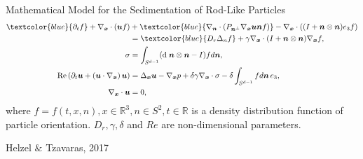\begin{frame}{Mathematical Model for the Sedimentation of Rod-Like Particles}
	\scriptsize
	\begin{align*}
		\textcolor{blue}{\partial_t f}+\nabla_{\boldsymbol{x}} \cdot(\boldsymbol{u} f) & +\textcolor{blue}{\nabla_{\boldsymbol{n}} \cdot\left(P_{\boldsymbol{n}^{\perp}} \nabla_{\boldsymbol{x}} \boldsymbol{u} \boldsymbol{n} f\right)}-\nabla_{\boldsymbol{x}} \cdot\left((I+\boldsymbol{n} \otimes \boldsymbol{n}) e_3 f\right) \\
		& =\textcolor{blue}{D_r \Delta_n f}+\gamma \nabla_{\boldsymbol{x}} \cdot(I+\boldsymbol{n} \otimes \boldsymbol{n}) \nabla_{\boldsymbol{x}} f, \notag \\
		\sigma & =\int_{S^{d-1}}(\text{d} \; \boldsymbol{n} \otimes \boldsymbol{n}-I) f d \boldsymbol{n},  \\
		\operatorname{Re}\left(\partial_t \boldsymbol{u}+\left(\boldsymbol{u} \cdot \nabla_{\boldsymbol{x}}\right) \boldsymbol{u}\right) & =\Delta_{\boldsymbol{x}} \boldsymbol{u}-\nabla_{\boldsymbol{x}} p+\delta \gamma \nabla_{\boldsymbol{x}} \cdot \sigma-\delta \int_{S^{d-1}} f d \boldsymbol{n} \, e_3, \\
		\nabla_{\boldsymbol{x}} \cdot \boldsymbol{u} & =0,
	\end{align*}
	where $f = f(t, x, n), x \in \mathbb{R}^3 , n \in  S^2, t \in \mathbb{R}$ is a density distribution function of particle orientation. $D_r, \gamma, \delta$ and $Re$ are non-dimensional parameters.
	
	\begin{beamercolorbox}[sep=1em,wd=\linewidth,right]{}
		\tiny{Helzel $\&$ Tzavaras, 2017}
	\end{beamercolorbox}
\end{frame}


